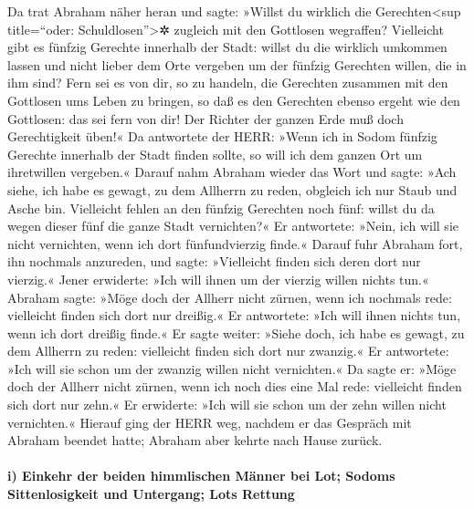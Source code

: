  Da trat Abraham näher heran und sagte: »Willst du
wirklich die Gerechten\textless sup title=``oder:
Schuldlosen''\textgreater✲ zugleich mit den Gottlosen wegraffen?
 Vielleicht gibt es fünfzig Gerechte innerhalb der Stadt:
willst du die wirklich umkommen lassen und nicht lieber dem Orte
vergeben um der fünfzig Gerechten willen, die in ihm sind?
 Fern sei es von dir, so zu handeln, die Gerechten
zusammen mit den Gottlosen ums Leben zu bringen, so daß es den Gerechten
ebenso ergeht wie den Gottlosen: das sei fern von dir! Der Richter der
ganzen Erde muß doch Gerechtigkeit üben!«  Da antwortete
der HERR: »Wenn ich in Sodom fünfzig Gerechte innerhalb der Stadt finden
sollte, so will ich dem ganzen Ort um ihretwillen vergeben.«
 Darauf nahm Abraham wieder das Wort und sagte: »Ach
siehe, ich habe es gewagt, zu dem Allherrn zu reden, obgleich ich nur
Staub und Asche bin.  Vielleicht fehlen an den fünfzig
Gerechten noch fünf: willst du da wegen dieser fünf die ganze Stadt
vernichten?« Er antwortete: »Nein, ich will sie nicht vernichten, wenn
ich dort fünfundvierzig finde.«  Darauf fuhr Abraham
fort, ihn nochmals anzureden, und sagte: »Vielleicht finden sich deren
dort nur vierzig.« Jener erwiderte: »Ich will ihnen um der vierzig
willen nichts tun.«  Abraham sagte: »Möge doch der
Allherr nicht zürnen, wenn ich nochmals rede: vielleicht finden sich
dort nur dreißig.« Er antwortete: »Ich will ihnen nichts tun, wenn ich
dort dreißig finde.«  Er sagte weiter: »Siehe doch, ich
habe es gewagt, zu dem Allherrn zu reden: vielleicht finden sich dort
nur zwanzig.« Er antwortete: »Ich will sie schon um der zwanzig willen
nicht vernichten.«  Da sagte er: »Möge doch der Allherr
nicht zürnen, wenn ich noch dies eine Mal rede: vielleicht finden sich
dort nur zehn.« Er erwiderte: »Ich will sie schon um der zehn willen
nicht vernichten.«  Hierauf ging der HERR weg, nachdem er
das Gespräch mit Abraham beendet hatte; Abraham aber kehrte nach Hause
zurück.

\hypertarget{i-einkehr-der-beiden-himmlischen-muxe4nner-bei-lot-sodoms-sittenlosigkeit-und-untergang-lots-rettung}{%
\paragraph{i) Einkehr der beiden himmlischen Männer bei Lot; Sodoms
Sittenlosigkeit und Untergang; Lots
Rettung}\label{i-einkehr-der-beiden-himmlischen-muxe4nner-bei-lot-sodoms-sittenlosigkeit-und-untergang-lots-rettung}}

